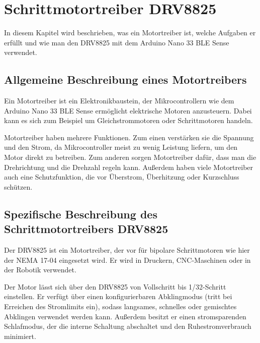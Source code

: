 %
%

\chapter{Schrittmotortreiber DRV8825}

In diesem Kapitel wird beschrieben, was ein Motortreiber ist, welche Aufgaben er erfüllt und wie man den DRV8825 mit dem Arduino Nano 33 BLE Sense verwendet.

\section{Allgemeine Beschreibung eines Motortreibers}

Ein Motortreiber ist ein Elektronikbaustein, der Mikrocontrollern wie dem Arduino Nano 33 BLE Sense ermöglicht elektrische Motoren anzusteuern. Dabei kann es sich zum Beispiel um Gleichstrommotoren oder Schrittmotoren handeln. 

Motortreiber haben mehrere Funktionen. Zum einen verstärken sie die Spannung und den Strom, da Mikrocontroller meist zu wenig Leistung liefern, um den Motor direkt zu betreiben. Zum anderen sorgen Motortreiber dafür, dass man die Drehrichtung und die Drehzahl regeln kann. Außerdem haben viele Motortreiber auch eine Schutzfunktion, die vor Überstrom, Überhitzung oder Kurzschluss schützen.


\section{Spezifische Beschreibung des Schrittmotortreibers DRV8825}

Der DRV8825 ist ein Motortreiber, der vor für bipolare Schrittmotoren wie hier der NEMA 17-04 eingesetzt wird. Er wird in Druckern, CNC-Maschinen oder in der Robotik verwendet.
 
Der Motor lässt sich über den DRV8825 von Vollschritt bis 1/32-Schritt einstellen. Er verfügt über einen konfigurierbaren Abklingmodus (tritt bei Erreichen des Stromlimits ein), sodass langsames, schnelles oder gemischtes Abklingen verwendet werden kann. Außerdem besitzt er einen stromsparenden Schlafmodus, der die interne Schaltung abschaltet und den Ruhestromverbrauch minimiert. 


